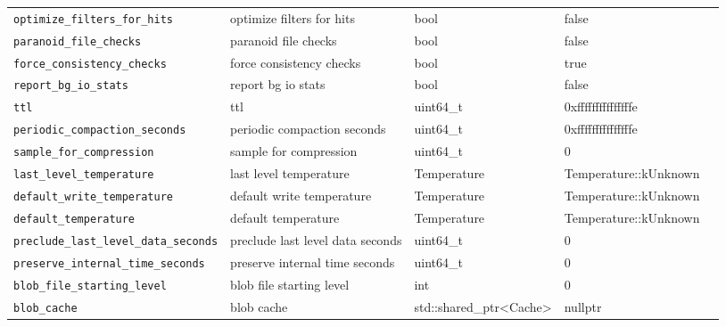 {{\begin{longtable}{@{}p{3.4cm}p{5.0cm}p{3.6cm}p{2.5cm}p{2.6cm}@{}}
    \texttt{optimize\_filters\_for\_hits}
    & optimize filters for hits
    & bool
    & false
    & \\

    \texttt{paranoid\_file\_checks}
    & paranoid file checks
    & bool
    & false
    & \\

    \texttt{force\_consistency\_checks}
    & force consistency checks
    & bool
    & true
    & \\

    \texttt{report\_bg\_io\_stats}
    & report bg io stats
    & bool
    & false
    & \\

    \texttt{ttl}
    & ttl
    & uint64\_t
    & 0xfffffffffffffffe
    & \\

    \texttt{periodic\_compaction\_seconds}
    & periodic compaction seconds
    & uint64\_t
    & 0xfffffffffffffffe
    & \\

    \texttt{sample\_for\_compression}
    & sample for compression
    & uint64\_t
    & 0
    & \\

    \texttt{last\_level\_temperature}
    & last level temperature
    & Temperature
    & Temperature::kUnknown
    & \\

    \texttt{default\_write\_temperature}
    & default write temperature
    & Temperature
    & Temperature::kUnknown
    & \\

    \texttt{default\_temperature}
    & default temperature
    & Temperature
    & Temperature::kUnknown
    & \\

    \texttt{preclude\_last\_level\_data\_seconds}
    & preclude last level data seconds
    & uint64\_t
    & 0
    & \\

    \texttt{preserve\_internal\_time\_seconds}
    & preserve internal time seconds
    & uint64\_t
    & 0
    & \\

    \texttt{blob\_file\_starting\_level}
    & blob file starting level
    & int
    & 0
    & \\

    \texttt{blob\_cache}
    & blob cache
    & std::shared\_ptr\textless{}Cache\textgreater{}
    & nullptr
    & \\


\end{longtable}}}
